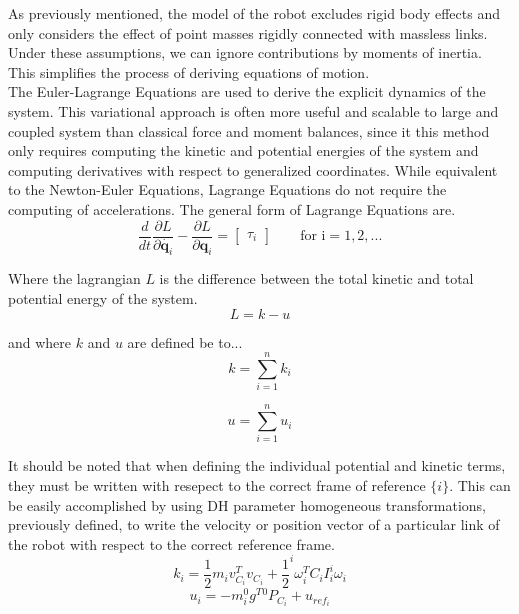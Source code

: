 \documentclass[journal]{IEEEtran}
\begin{document}
As previously mentioned, the model of the robot excludes rigid body effects and only considers the effect of point masses rigidly connected with massless links. Under these assumptions, we can ignore contributions by moments of inertia. This simplifies the process of deriving equations of motion. \cite{meriam_engineering_1993} \\

The Euler-Lagrange Equations are used to derive the explicit dynamics of the system. This variational approach is often more useful and scalable to large and coupled system than classical force and moment balances, since it this method only requires computing the kinetic and potential energies of the system and computing derivatives with respect to generalized coordinates. While equivalent to the Newton-Euler Equations\cite{greenwood_advanced_2006}, Lagrange Equations do not require the computing of accelerations. The general form of Lagrange Equations are.
\begin{equation}
\frac{d}{d t} \frac{\partial L}{\partial \dot{\boldsymbol{q}_{i}}}-\frac{\partial L}{\partial \boldsymbol{q}_{i}}=\left[\begin{array}{l}
\tau_{i}
\end{array}\right]
 \quad \quad \text{for i} = 1,2,...
\end{equation}

\noindent Where the lagrangian $L$ is the difference between the total kinetic and total potential energy of the system.
\begin{equation}
  L = k - u
\end{equation}

\noindent and where $k$ and $u$ are defined be to...
\begin{equation}
k=\sum_{i=1}^{n} k_{i}
\end{equation}

\begin{equation}
u=\sum_{i=1}^{n} u_{i}
\end{equation}

It should be noted that when defining the individual potential and kinetic terms, they must be written with resepect to the correct frame of reference $\{ i \}$. This can be easily accomplished by using DH parameter homogeneous transformations, previously defined, to write the velocity or position vector of a particular link of the robot with respect to the correct reference frame.
\begin{equation}
k_{i}=\frac{1}{2} m_{i} v_{C_{i}}^{T} v_{C_{i}}+\frac{1}{2}^{i} \omega_{i}^{T} C_{i} I_{i}^{i} \omega_{i}
\end{equation}
\begin{equation}
u_{i}=-m_{i}^{0} g^{T}{ }^{0} P_{C_{i}}+u_{r e f_{i}}
\end{equation}
\end{document}
